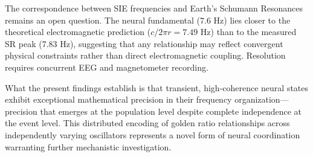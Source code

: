\documentclass[11pt,a4paper]{article}
\begin{document}
The correspondence between SIE frequencies and Earth's Schumann Resonances remains an open question. The neural fundamental (7.6 Hz) lies closer to the theoretical electromagnetic prediction ($c/2\pi r = 7.49$ Hz) than to the measured SR peak (7.83 Hz), suggesting that any relationship may reflect convergent physical constraints rather than direct electromagnetic coupling. Resolution requires concurrent EEG and magnetometer recording.

What the present findings establish is that transient, high-coherence neural states exhibit exceptional mathematical precision in their frequency organization—precision that emerges at the population level despite complete independence at the event level. This distributed encoding of golden ratio relationships across independently varying oscillators represents a novel form of neural coordination warranting further mechanistic investigation.

\printbibliography
\end{document}
